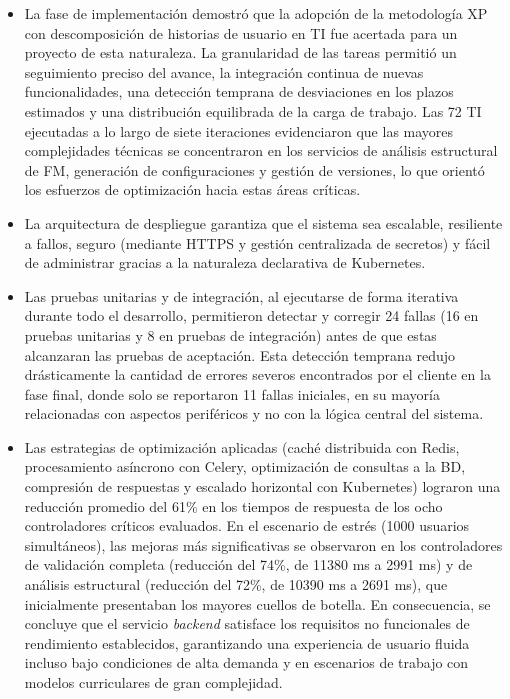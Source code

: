 \begin{itemize}
    \item La fase de implementación demostró que la adopción de la metodología \ac{XP} con descomposición de historias de usuario en \ac{TI} 
    fue acertada para un proyecto de esta naturaleza. La granularidad de las tareas 
    permitió un seguimiento preciso del avance, la integración continua de nuevas funcionalidades,
    una detección temprana de desviaciones en los plazos estimados y una 
    distribución equilibrada de la carga de trabajo. Las 72 \ac{TI} ejecutadas
    a lo largo de siete iteraciones evidenciaron que las mayores complejidades técnicas se concentraron en los servicios de 
    análisis estructural de \ac{FM}, generación de configuraciones y gestión de versiones, lo que orientó los esfuerzos de 
    optimización hacia estas áreas críticas.

    \item La arquitectura de despliegue garantiza que el sistema sea escalable, resiliente a fallos, 
    seguro (mediante \ac{HTTPS} y gestión centralizada de secretos) y fácil de administrar gracias a 
    la naturaleza declarativa de Kubernetes.
  
    \item Las pruebas unitarias y de integración, al ejecutarse de forma iterativa durante todo el desarrollo, permitieron detectar y 
    corregir 24 fallas (16 en pruebas unitarias y 8 en pruebas de integración) antes de que estas alcanzaran las pruebas de aceptación. 
    Esta detección temprana redujo drásticamente la cantidad de errores severos encontrados por el cliente en la fase final, donde solo se 
    reportaron 11 fallas iniciales, en su mayoría relacionadas con aspectos periféricos y no con la lógica central del sistema.
    
    \item Las estrategias de optimización aplicadas (caché distribuida con Redis, procesamiento asíncrono con Celery, optimización de 
    consultas a la \ac{BD}, compresión de respuestas y escalado horizontal con Kubernetes) lograron una reducción promedio del 61\% 
    en los tiempos de respuesta de los ocho controladores críticos evaluados. En el escenario de estrés (1000 usuarios simultáneos), las mejoras 
    más significativas se observaron en los controladores de validación completa (reducción del 74\%, de 11380 ms a 2991 ms) y de análisis 
    estructural (reducción del 72\%, de 10390 ms a 2691 ms), que inicialmente presentaban los mayores cuellos de botella. En consecuencia, 
    se concluye que el servicio \textit{backend} satisface los requisitos no funcionales de rendimiento 
    establecidos, garantizando una experiencia de usuario fluida incluso bajo condiciones de alta demanda y 
    en escenarios de trabajo con modelos curriculares de gran complejidad.
    

\end{itemize}
